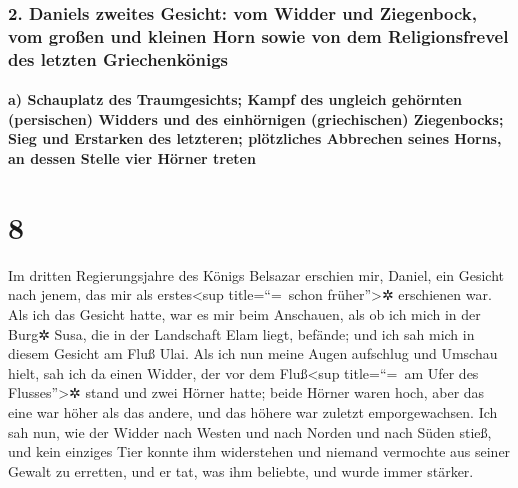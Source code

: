 \hypertarget{daniels-zweites-gesicht-vom-widder-und-ziegenbock-vom-grouxdfen-und-kleinen-horn-sowie-von-dem-religionsfrevel-des-letzten-griechenkuxf6nigs}{%
\subsubsection{2. Daniels zweites Gesicht: vom Widder und Ziegenbock,
vom großen und kleinen Horn sowie von dem Religionsfrevel des letzten
Griechenkönigs}\label{daniels-zweites-gesicht-vom-widder-und-ziegenbock-vom-grouxdfen-und-kleinen-horn-sowie-von-dem-religionsfrevel-des-letzten-griechenkuxf6nigs}}

\hypertarget{a-schauplatz-des-traumgesichts-kampf-des-ungleich-gehuxf6rnten-persischen-widders-und-des-einhuxf6rnigen-griechischen-ziegenbocks-sieg-und-erstarken-des-letzteren-pluxf6tzliches-abbrechen-seines-horns-an-dessen-stelle-vier-huxf6rner-treten}{%
\paragraph{a) Schauplatz des Traumgesichts; Kampf des ungleich gehörnten
(persischen) Widders und des einhörnigen (griechischen) Ziegenbocks;
Sieg und Erstarken des letzteren; plötzliches Abbrechen seines Horns, an
dessen Stelle vier Hörner
treten}\label{a-schauplatz-des-traumgesichts-kampf-des-ungleich-gehuxf6rnten-persischen-widders-und-des-einhuxf6rnigen-griechischen-ziegenbocks-sieg-und-erstarken-des-letzteren-pluxf6tzliches-abbrechen-seines-horns-an-dessen-stelle-vier-huxf6rner-treten}}

\hypertarget{section-7}{%
\section{8}\label{section-7}}

Im dritten Regierungsjahre des Königs Belsazar erschien
mir, Daniel, ein Gesicht nach jenem, das mir als erstes\textless sup
title=``=~schon früher''\textgreater✲ erschienen war. Als
ich das Gesicht hatte, war es mir beim Anschauen, als ob ich mich in der
Burg✲ Susa, die in der Landschaft Elam liegt, befände; und ich sah mich
in diesem Gesicht am Fluß Ulai. Als ich nun meine Augen
aufschlug und Umschau hielt, sah ich da einen Widder, der vor dem
Fluß\textless sup title=``=~am Ufer des Flusses''\textgreater✲ stand und
zwei Hörner hatte; beide Hörner waren hoch, aber das eine war höher als
das andere, und das höhere war zuletzt emporgewachsen. Ich
sah nun, wie der Widder nach Westen und nach Norden und nach Süden
stieß, und kein einziges Tier konnte ihm widerstehen und niemand
vermochte aus seiner Gewalt zu erretten, und er tat, was ihm beliebte,
und wurde immer stärker.

